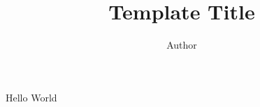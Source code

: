 \documentclass[11pt]{amsart}%
\title{Template Title}
\author{Author}
\begin{document}
\maketitle

Hello World
\end{document}
